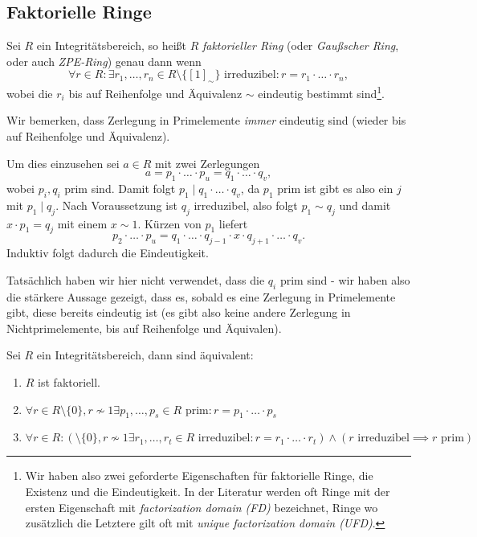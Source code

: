 
\subsection{Faktorielle Ringe}

\begin{definition}
    Sei $R$ ein Integritätsbereich, so heißt $R$ \emph{faktorieller Ring} (oder \emph{Gaußscher Ring}, oder auch \emph{ZPE-Ring}) genau dann wenn
    $$ \forall r \in R : \exists r_1, \hdots, r_n \in R \setminus \{ [1]_\sim \} \text{ irreduzibel} : r = r_1 \cdot \hdots \cdot r_n, $$
    wobei die $r_i$ bis auf Reihenfolge und Äquivalenz $\sim$ eindeutig bestimmt sind\footnote{Wir haben also zwei geforderte Eigenschaften für faktorielle Ringe, die Existenz und die Eindeutigkeit. In der Literatur werden oft Ringe mit der ersten Eigenschaft mit \emph{factorization domain (FD)} bezeichnet, Ringe wo zusätzlich die Letztere gilt oft mit \emph{unique factorization domain (UFD)}.}.
\end{definition}

\begin{remark}
    Wir bemerken, dass Zerlegung in Primelemente \emph{immer} eindeutig sind (wieder bis auf Reihenfolge und Äquivalenz).

    Um dies einzusehen sei $a \in R$ mit zwei Zerlegungen
    $$ a = p_1 \cdot \hdots \cdot p_u = q_1 \cdot \hdots \cdot q_v, $$
    wobei $p_i, q_i$ prim sind. Damit folgt $p_1 \mid q_1 \cdot \hdots \cdot q_v$, da $p_1$ prim ist gibt es also ein $j$ mit $p_1 \mid q_j$. Nach Voraussetzung ist $q_j$ irreduzibel, also folgt $p_1 \sim q_j$ und damit $x \cdot p_1 = q_j$ mit einem $x \sim 1$. Kürzen von $p_1$ liefert
    $$ p_2 \cdot \hdots \cdot p_u = q_1 \cdot \hdots \cdot q_{j-1} \cdot x \cdot q_{j+1} \cdot \hdots \cdot q_v. $$
    Induktiv folgt dadurch die Eindeutigkeit.

    Tatsächlich haben wir hier nicht verwendet, dass die $q_i$ prim sind - wir haben also die stärkere Aussage gezeigt, dass es, sobald es eine Zerlegung in Primelemente gibt, diese bereits eindeutig ist (es gibt also keine andere Zerlegung in Nichtprimelemente, bis auf Reihenfolge und Äquivalen).
\end{remark}

\begin{proposition}
    Sei $R$ ein Integritätsbereich, dann sind äquivalent:
    \begin{enumerate}
        \item $R$ ist faktoriell.
        \item $ \forall r \in R \setminus \{0\}, r \not\sim 1 \exists p_1, \hdots, p_s \in R \text{ prim}: r = p_1 \cdot \hdots \cdot p_s $
        \item $ \forall r \in R: ( \setminus \{0\}, r \not\sim 1 \exists r_1, \hdots, r_t \in R \text{ irreduzibel}: r = r_1 \cdot \hdots \cdot r_t ) \land ( r \text{ irreduzibel} \implies r \text{ prim} ) $
    \end{enumerate}
\end{proposition}



